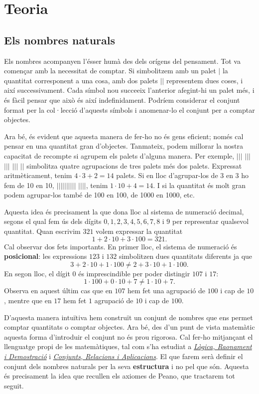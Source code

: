 
\chapter{Teoria}
\label{cap:teoria}

\section{Els nombres naturals}

Els nombres acompanyen l'ésser humà des dels orígens del pensament. Tot va començar amb la necessitat de comptar. Si simbolitzem amb un palet $\vert$ la quantitat corresponent a una cosa, amb dos palets $\vert\vert$ representem dues coses, i així successivament. Cada símbol nou succeeix l'anterior afegint-hi un palet més, i és fàcil pensar que això és així indefinidament. Podríem considerar el conjunt format per la col·lecció d'aquests símbols i anomenar-lo el conjunt per a comptar objectes.

Ara bé, és evident que aquesta manera de fer-ho no és gens eficient; només cal pensar en una quantitat gran d'objectes. Tanmateix, podem millorar la nostra capacitat de recompte si agrupem els palets d'alguna manera. Per exemple, $\vert\vert\vert$ $\vert\vert\vert$ $\vert\vert\vert$ $\vert\vert\vert$ $\vert\vert$ simbolitza quatre agrupacions de tres palets més dos palets. Expressat aritmèticament, tenim $4\cdot 3+2=14$ palets. Si en lloc d'agrupar-los de 3 en 3 ho fem de 10 en 10, $\vert\vert\vert\vert\vert\vert\vert\vert\vert\vert$ $\vert\vert\vert\vert$, tenim $1\cdot 10+4=14$. I si la quantitat és molt gran podem agrupar-los també de 100 en 100, de 1000 en 1000, etc.

Aquesta idea és precisament la que dona lloc al sistema de numeració decimal, segons el qual fem ús dels dígits $0,1,2,3,4,5,6,7,8$ i $9$ per representar qualsevol quantitat. Quan escrivim $321$ volem expressar la quantitat
\[
1+2\cdot 10+3\cdot 100=321.
\]
Cal observar dos fets importants. En primer lloc, el sistema de numeració és \textbf{posicional}: les expressions $123$ i $132$ simbolitzen dues quantitats diferents ja que
\[
3+2\cdot 10+1\cdot 100\neq 2+3\cdot 10+1\cdot 100.
\]
En segon lloc, el dígit $0$ és imprescindible per poder distingir $107$ i $17$:
\[
1\cdot 100+0\cdot 10+7\neq 1\cdot 10+7.
\]
Observa en aquest últim cas que en $107$ hem fet una agrupació de $100$ i cap de $10$, mentre que en $17$ hem fet $1$ agrupació de $10$ i cap de $100$.

D'aquesta manera intuïtiva hem construït un conjunt de nombres que ens permet comptar quantitats o comptar objectes. Ara bé, des d'un punt de vista matemàtic aquesta forma d'introduir el conjunt no és prou rigorosa. Cal fer-ho mitjançant el llenguatge propi de les matemàtiques, tal com s'ha estudiat a \href{https://aprendes.com/batxillerat/logica/main.pdf}{\emph{Lògica, Raonament i Demostració}} i \href{https://aprendes.com/batxillerat/conjunts/main.pdf}{\emph{Conjunts, Relacions i Aplicacions}}. El que farem serà definir el conjunt dels nombres naturals per la seva \textbf{estructura} i no pel que són. Aquesta és precisament la idea que recullen els axiomes de Peano, que tractarem tot seguit.


